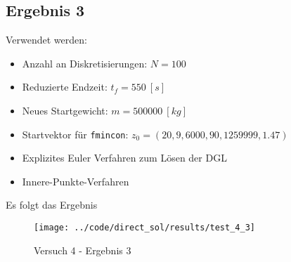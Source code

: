 \subsection{Ergebnis 3}\label{kap:Versuch43}
Verwendet werden:
\begin{itemize}
\item Anzahl an Diskretisierungen: $N = 100$ 
\item Reduzierte Endzeit: $t_f = 550 \ [s]$
\item Neues Startgewicht: $m = 500000 \ [kg]$
\item Startvektor für \texttt{fmincon}: $z_0 = (20,9,6000,90,1259999,1.47)$
\item Explizites Euler Verfahren zum Lösen der DGL
%
\item Innere-Punkte-Verfahren
\end{itemize}
Es folgt das Ergebnis
\begin{figure}[H]
\begin{center}
\texttt{[image: ../code/direct\_sol/results/test\_4\_3]}
\caption{Versuch 4 - Ergebnis 3}\label{img:test_4_3}
\end{center}
\end{figure}







%





%
%







